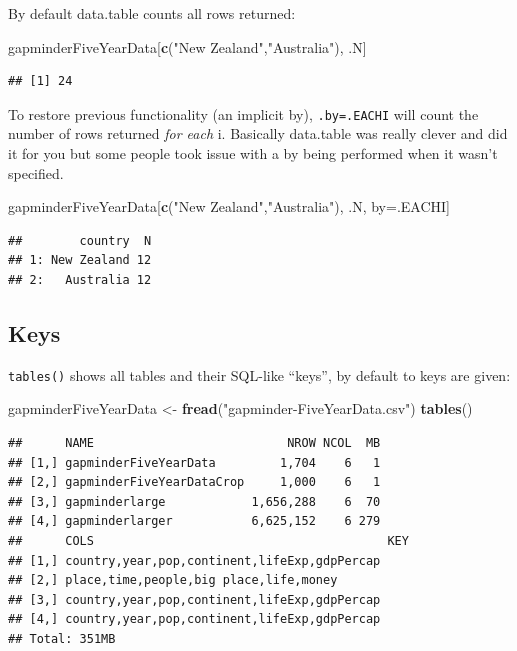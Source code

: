 \documentclass[]{article}
\newenvironment{Shaded}{\begin{snugshade}}{\end{snugshade}}
\newcommand{\KeywordTok}[1]{\textcolor[rgb]{0.13,0.29,0.53}{\textbf{{#1}}}}
\newcommand{\StringTok}[1]{\textcolor[rgb]{0.31,0.60,0.02}{{#1}}}
\newcommand{\NormalTok}[1]{{#1}}
\begin{document}
By default data.table counts all rows returned:

\begin{Shaded}
\begin{Highlighting}[]
\NormalTok{gapminderFiveYearData[}\KeywordTok{c}\NormalTok{(}\StringTok{"New Zealand"}\NormalTok{,}\StringTok{"Australia"}\NormalTok{), .N]}
\end{Highlighting}
\end{Shaded}

\begin{verbatim}
## [1] 24
\end{verbatim}

To restore previous functionality (an implicit by), \texttt{.by=.EACHI}
will count the number of rows returned \emph{for each} i. Basically
data.table was really clever and did it for you but some people took
issue with a by being performed when it wasn't specified.

\begin{Shaded}
\begin{Highlighting}[]
\NormalTok{gapminderFiveYearData[}\KeywordTok{c}\NormalTok{(}\StringTok{"New Zealand"}\NormalTok{,}\StringTok{"Australia"}\NormalTok{), .N, by=.EACHI]}
\end{Highlighting}
\end{Shaded}

\begin{verbatim}
##        country  N
## 1: New Zealand 12
## 2:   Australia 12
\end{verbatim}

\subsection{Keys}\label{keys}

\texttt{tables()} shows all tables and their SQL-like ``keys'', by
default to keys are given:

\begin{Shaded}
\begin{Highlighting}[]
\NormalTok{gapminderFiveYearData <-}\StringTok{ }\KeywordTok{fread}\NormalTok{(}\StringTok{"gapminder-FiveYearData.csv"}\NormalTok{)}
\KeywordTok{tables}\NormalTok{()}
\end{Highlighting}
\end{Shaded}

\begin{verbatim}
##      NAME                           NROW NCOL  MB
## [1,] gapminderFiveYearData         1,704    6   1
## [2,] gapminderFiveYearDataCrop     1,000    6   1
## [3,] gapminderlarge            1,656,288    6  70
## [4,] gapminderlarger           6,625,152    6 279
##      COLS                                         KEY
## [1,] country,year,pop,continent,lifeExp,gdpPercap    
## [2,] place,time,people,big place,life,money          
## [3,] country,year,pop,continent,lifeExp,gdpPercap    
## [4,] country,year,pop,continent,lifeExp,gdpPercap    
## Total: 351MB
\end{verbatim}
\end{document}
